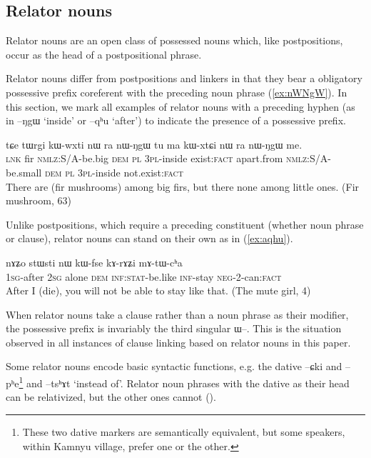 \documentclass[oldfontcommands,oneside,a4paper,11pt]{article}
\newcommand{\ipa}[1]{{\phon \mbox{#1}}} %
\newcommand{\refb}[1]{(\ref{#1})}
\begin{document}
\subsection{Relator nouns} \label{sec:relator}
Relator nouns are an open class of possessed nouns which, like postpositions, occur as the head of a postpositional phrase. 

Relator nouns differ from postpositions and linkers in that they bear a obligatory possessive prefix coreferent with the preceding    noun phrase \refb{ex:nWNgW}. In this section, we mark all examples of relator nouns with a preceding hyphen (as in \ipa{--ŋgɯ} `inside' or \ipa{--qʰu} `after') to indicate the  presence of a possessive prefix.

 \begin{exe}
\ex \label{ex:nWNgW} 
\gll  
\ipa{tɕe}  	\ipa{tɯrgi}  	\ipa{kɯ-wxti}  	\ipa{nɯ} \ipa{ra}  	\ipa{nɯ-ŋgɯ}  	\ipa{tu}  	\ipa{ma}  	\ipa{kɯ-xtɕi}  	\ipa{nɯ} \ipa{ra}  	\ipa{nɯ-ŋgɯ}  	\ipa{me.}  \\
\textsc{lnk} fir \textsc{nmlz}:S/A-be.big \textsc{dem} \textsc{pl} \textsc{3pl}-inside exist:\textsc{fact} apart.from \textsc{nmlz:S/A}-be.small  \textsc{dem} \textsc{pl} \textsc{3pl}-inside  not.exist:\textsc{fact} \\
\glt There are (fir mushrooms) among big firs, but there none among little ones. (Fir mushroom, 63)
\end{exe}


Unlike postpositions, which require a preceding constituent (whether noun phrase or clause), relator nouns can stand on their own as in \refb{ex:aqhu}.

 \begin{exe}
\ex \label{ex:aqhu} 
\gll  \ipa{a-qʰu}  	\ipa{nɤʑo}  	\ipa{stɯsti}  	\ipa{nɯ}  	\ipa{kɯ-fse}  	\ipa{kɤ-rɤʑi}  	\ipa{mɤ-tɯ-cʰa}  \\
\textsc{1sg}-after \textsc{2sg} alone \textsc{dem} \textsc{inf:stat}-be.like \textsc{inf}-stay \textsc{neg-2}-can:\textsc{fact} \\
\glt After I (die), you will not be able to stay like that. (The mute girl, 4)
\end{exe}

When relator nouns take a clause  rather than a noun phrase as their modifier, the possessive prefix is invariably the third singular \ipa{ɯ--}. This is the situation observed in all instances of clause linking based on relator nouns in this paper.



Some relator nouns encode basic syntactic functions, e.g. the dative \ipa{--ɕki} and \ipa{--pʰe}\footnote{These two dative markers are semantically equivalent, but some speakers, within Kamnyu village, prefer one or the other.} and \ipa{--tsʰɤt} `instead of'.   Relator noun phrases with the dative as their head can be relativized, but the other ones cannot (\citealt{jacques14relatives}).
\end{document}
